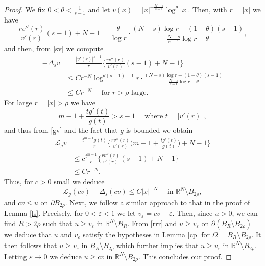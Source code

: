 \documentclass[10pt,a4paper]{amsart}
\numberwithin{equation}{section}
\newcommand{\R}{\mathbb R}
\newcommand{\Lg}{{\mathcal L}_g}
\begin{document}
\begin{proof} We fix $0<\theta<\frac{1}{s-1}$ and let $v(x)=|x|^{-\frac{N-s}{s-1}}\log^\theta |x|$. Then, with $r=|x|$ we have 
$$
\frac{rv''(r)}{v'(r)}(s-1)+N-1=\frac{\theta}{\log r}\cdot \frac{(N-s)\log r+(1-\theta)(s-1)}{\frac{N-s}{s-1}\log r-\theta},
$$
and then, from \eqref{sv} we compute
$$
\begin{aligned}
-\Delta_s v&=\frac{|v'(r)|^{s-1}}{r}\Big\{\frac{rv''(r)}{v'(r)}(s-1)+N-1\Big\}\\
&\leq C r^{-N}\log^{\theta(s-1)-1} r \cdot \frac{(N-s)\log r+(1-\theta)(s-1)}{\frac{N-s}{s-1}\log r-\theta}\\
&\leq C r^{-N}\quad\mbox{ for $r>\rho$ large}.
\end{aligned}
$$
For large $r=|x|>\rho$ we have 
$$
m-1+\frac{tg'(t)}{g(t)}>s-1 \quad\mbox{ where }t=|v'(r)|\, ,
$$
and thus from \eqref{gv} and the fact that $g$ is bounded we obtain
$$
\begin{aligned}
\Lg v&=\frac{t^{m-1}g(t)}{r}\Big\{\frac{rv''(r)}{v'(r)}\Big(m-1+\frac{tg'(t)}{g(t)}\Big)+N-1\Big\}\\
&\leq c\frac{t^{m-1}}{r}\Big\{\frac{rv''(r)}{v'(r)}(s-1)+N-1\Big\}\\
&\leq C r^{-N}.
\end{aligned}
$$
Thus, for $c>0$ small we deduce
\begin{equation}\label{rrr}
\Lg (cv)-\Delta_s (cv)\leq C|x|^{-N} \quad\mbox{ in }\R^N\setminus B_{2\rho},
\end{equation}
 and $cv\leq u$ on $\partial B_{2\rho}$. 
Next, we follow a similar approach to that in the proof of Lemma \ref{ls}. Precisely, for $0<\varepsilon<1$ we let $v_{\varepsilon}=cv-\varepsilon$. Then, since $u>0$, we can find $R>2\rho$ such that $u\geq v_\varepsilon$ in $\R^N\setminus B_{R}$. From \eqref{rrr} and $u\geq v_\varepsilon$ on $\partial (B_{R}\setminus B_{2\rho})$ we deduce that $u$ and $v_\varepsilon$ satisfy the hypotheses in Lemma \ref{cp} for $\Omega=B_{R}\setminus B_{2\rho}$. It then follows that $u\geq v_\varepsilon$ in $B_{R}\setminus B_{2\rho}$ which further implies that $u\geq v_\varepsilon$ in $\R^N\setminus B_{2\rho}$. Letting $\varepsilon\to 0$ we deduce $u\geq cv$ in $\R^N\setminus B_{2\rho}$.  This concludes our proof.
\end{proof}
\end{document}
